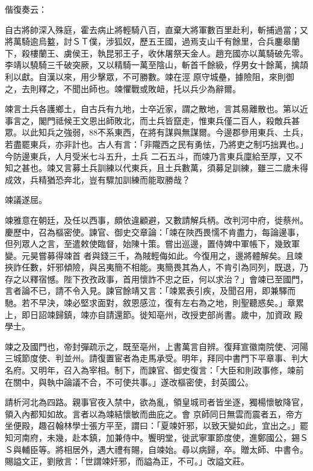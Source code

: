 \begin{pinyinscope}
 偕復奏云：



 自古將帥深入殊庭，霍去病止將輕騎八百，直棄大將軍數百里赴利，斬捕過當；又將萬騎逾烏盭，討ＳＴ僕，涉狐奴，歷五王國，過焉支山千有餘里，合兵鏖皋蘭下，殺樓蘭王、虜侯王，執昆邪王子，收休屠祭天金人。趙充國亦以萬騎破先零。李靖以驍騎三千破突厥，又以精騎一萬至陰山，斬首千餘級，俘男女十餘萬，擒頡利以獻。自漢以來，用少擊眾，不可勝數。竦在涇
 原守城壘，據險阻，來則御之，去則釋之，不聞出師也。竦懼戰或敗衄，托以兵少為辭爾。



 竦言土兵各護鄉土，自古兵有九地，士卒近家，謂之散地，言其易離散也。第以近事言之，閣門祗候王文恩出師敗北，而土兵皆竄走，惟東兵僅二百人，殺敵兵甚眾。以此知兵之強弱，88不系東西，在將有謀與無謀爾。今邊郡參用東兵、土兵，若盡罷東兵，亦非計也。古人有言：「非隴西之民有勇怯，乃將吏之制巧拙異也。」今防邊東兵，人月受米七斗五升，土兵
 二石五斗，而竦乃言東兵廩給至厚，又不知之甚也。竦又言募土兵訓練以代東兵，且土兵數萬，須募足訓練，雖三二歲未得成效，兵精猶恐奔北，豈有驟加訓練而能取勝哉？



 竦議遂屈。



 竦雅意在朝廷，及任以西事，頗依違顧避，又數請解兵柄。改判河中府，徙蔡州。慶歷中，召為樞密使。諫官、御史交章論：「竦在陜西畏懦不肯盡力，每論邊事，但列眾人之言，至遣敕使臨督，始陳十策。嘗出巡邊，置侍婢中軍帳下，幾致軍變。元昊嘗募得竦首
 者與錢三千，為賊輕侮如此。今復用之，邊將體解矣。且竦挾詐任數，奸邪傾險，與呂夷簡不相能。夷簡畏其為人，不肯引為同列，既退，乃存之以釋宿憾。陛下孜孜政事，首用懷詐不忠之臣，何以求治？」會竦已至國門，言者論不已，請不令入見。諫官餘靖又言：「竦累表引疾，及聞召用，即兼驛而馳。若不早決，竦必堅求面對，敘恩感泣，復有左右為之地，則聖聽惑矣。」章累上，即日詔竦歸鎮，竦亦自請還節。徙知亳州，改授吏部尚書。歲中，加資政
 殿學士。



 竦之及國門也，帝封彈疏示之，既至亳州，上書萬言自辨。復拜宣徽南院使、河陽三城節度使、判並州。請復置宦者為走馬承受。明年，拜同中書門下平章事、判大名府。又明年，召入為宰相。制下，而諫官、御史復言：「大臣和則政事修，竦前在關中，與執中論議不合，不可使共事。」遂改樞密使，封英國公。



 請析河北為四路。親事官夜入禁中，欲為亂，領皇城司者皆坐逐，獨楊懷敏降官，領入內都知如故。言者以為竦結懷敏而曲庇之。會
 京師同日無雲而震者五，帝方坐便殿，趣召翰林學士張方平至，謂曰：「夏竦奸邪，以致天變如此，宜出之。」罷知河南府，未幾，赴本鎮，加兼侍中。饗明堂，徙武寧軍節度使，進鄭國公，錫ＳＳ與輔臣等。將相居外，遇大禮有賜，自竦始。尋以病歸，卒。贈太師、中書令。賜謚文正，劉敞言：「世謂竦奸邪，而謚為正，不可。」改謚文莊。




\end{pinyinscope}
